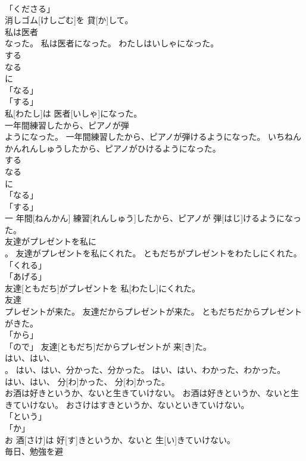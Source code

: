 \documentclass[8pt]{extreport}
\begin{document}
\begin{CJK}{UTF8}{min}
\\	「くださる」　
\\	消しゴム[けしごむ]を 貸[か]して。		
\\	私は医者
\\	なった。	私は医者になった。	わたしはいしゃになった。	
\\	する 
\\	なる 
\\	に 
\\	「なる」 
\\	「する」 
\\	私[わたし]は 医者[いしゃ]になった。		
\\	一年間練習したから、ピアノが弾
\\	ようになった。	一年間練習したから、ピアノが弾けるようになった。	いちねんかんれんしゅうしたから、ピアノがひけるようになった。	
\\	する 
\\	なる 
\\	に 
\\	「なる」 
\\	「する」 
\\	一 年間[ねんかん] 練習[れんしゅう]したから、ピアノが 弾[はじ]けるようになった。		
\\	友達がプレゼントを私に
\\	。	友達がプレゼントを私にくれた。	ともだちがプレゼントをわたしにくれた。	
\\	「くれる」 
\\	「あげる」 
\\	友達[ともだち]がプレゼントを 私[わたし]にくれた。		
\\	友達
\\	プレゼントが来た。	友達だからプレゼントが来た。	ともだちだからプレゼントがきた。	
\\	「から」 
\\	「ので」	友達[ともだち]だからプレゼントが 来[き]た。		
\\	はい、はい、
\\	。	はい、はい、分かった、分かった。	はい、はい、わかった、わかった。	
\\	はい、はい、 分[わ]かった、 分[わ]かった。		
\\	お酒は好きというか、ないと生きていけない。	お酒は好きというか、ないと生きていけない。	おさけはすきというか、ないといきていけない。	
\\	「という」 
\\	「か」 
\\	お 酒[さけ]は 好[す]きというか、ないと 生[い]きていけない。		
\\	毎日、勉強を避

\end{CJK}
\end{document}
